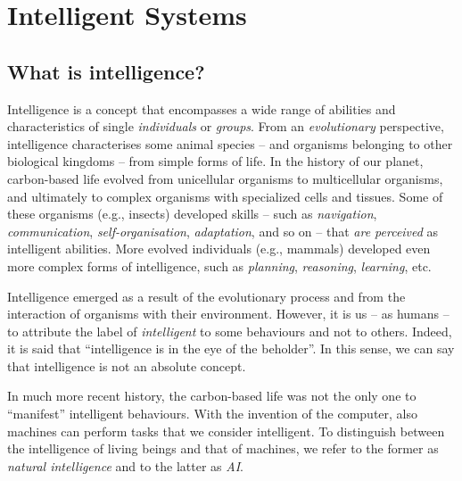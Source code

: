 
\chapter{Intelligent Systems}
\label{ch:intelligent-systems}

\section{What is intelligence?}\label{sec:what-is-intelligence}

Intelligence is a concept that encompasses a wide range of abilities and characteristics of single \emph{individuals} or \emph{groups}.
%
From an \emph{evolutionary} perspective, intelligence characterises some animal species -- and organisms belonging to other biological kingdoms -- from simple forms of life.
%
In the history of our planet, carbon-based life evolved from unicellular organisms to multicellular organisms, and ultimately to complex organisms with specialized cells and tissues.
%
Some of these organisms (e.g., insects) developed skills -- such as \emph{navigation}, \emph{communication}, \emph{self-organisation}, \emph{adaptation}, and so on -- that \emph{are perceived} as intelligent abilities.
%
More evolved individuals (e.g., mammals) developed even more complex forms of intelligence, such as \emph{planning}, \emph{reasoning}, \emph{learning}, etc.


Intelligence emerged as a result of the evolutionary process and from the interaction of organisms with their environment.
%
However, it is us -- as humans -- to attribute the label of \emph{intelligent} to some behaviours and not to others.
%
Indeed, it is said that ``intelligence is in the eye of the beholder''.
%
In this sense, we can say that intelligence is not an absolute concept.


In much more recent history, the carbon-based life was not the only one to ``manifest'' intelligent behaviours.
%
With the invention of the computer, also machines can perform tasks that we consider intelligent.
%
To distinguish between the intelligence of living beings and that of machines, we refer to the former as \emph{natural intelligence} and to the latter as \emph{\gls{AI}}.
%



